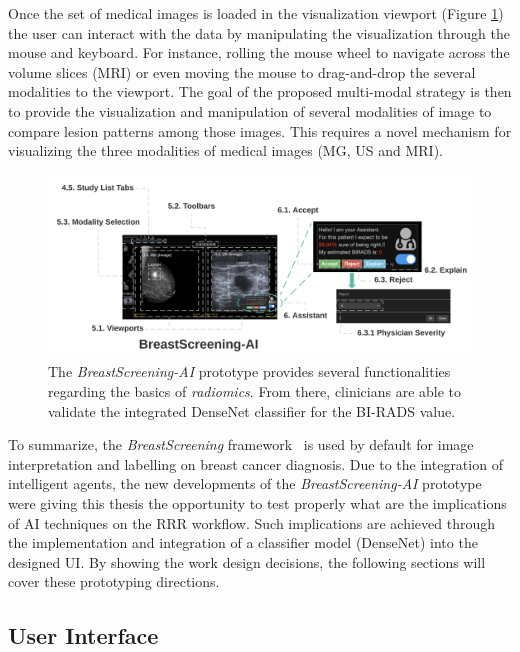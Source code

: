 Once the set of medical images is loaded in the visualization viewport (Figure \ref{fig:fig031}) the user can interact with the data by manipulating the visualization through the mouse and keyboard.
For instance, rolling the mouse wheel to navigate across the volume slices (\ac{MRI}) or even moving the mouse to drag-and-drop the several modalities to the viewport.
The goal of the proposed multi-modal strategy is then to provide the visualization and manipulation of several modalities of image to compare lesion patterns among those images.
This requires a novel mechanism for visualizing the three modalities of medical images (\ac{MG}, \ac{US} and \ac{MRI}).

\begin{figure}[ht]
\centering
\includegraphics[width=\textwidth]{images/fig031}
\caption{The {\it BreastScreening-AI} prototype provides several functionalities regarding the basics of {\it radiomics}. From there, clinicians are able to validate the integrated DenseNet classifier for the BI-RADS value.}
\label{fig:fig031}
\end{figure}

To summarize, the {\it BreastScreening} framework~\cite{https://doi.org/10.13140/rg.2.2.29816.70409} is used by default for image interpretation and labelling on breast cancer diagnosis.
Due to the integration of intelligent agents, the new developments of the {\it BreastScreening-AI} prototype were giving this thesis the opportunity to test properly what are the implications of \ac{AI} techniques on the \ac{RRR} workflow.
Such implications are achieved through the implementation and integration of a classifier model (DenseNet) into the designed \ac{UI}.
By showing the work design decisions, the following sections will cover these prototyping directions.

\subsection{User Interface}
\label{sec:chap005004002}

